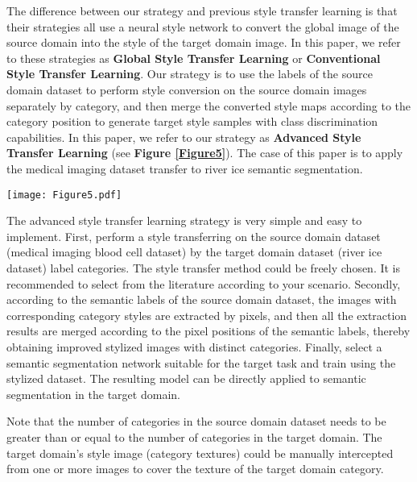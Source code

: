 \documentclass[a4paper,fleqn]{cas-dc}
\begin{document}
The difference between our strategy and previous style transfer learning \cite{Li_Ye_Cao_Hou_Yang_2021, Kline_2021, Zhao_Wei_Lu_Bai_Zhao_Chen_Hu_2023} is that their strategies all use a neural style network to convert the global image of the source domain into the style of the target domain image. In this paper, we refer to these strategies as \textbf{Global Style Transfer Learning} or \textbf{Conventional Style Transfer Learning}. Our strategy is to use the labels of the source domain dataset to perform style conversion on the source domain images separately by category, and then merge the converted style maps according to the category position to generate target style samples with class discrimination capabilities. In this paper, we refer to our strategy as \textbf{Advanced Style Transfer Learning} (see \textbf{Figure \ref{Figure5}}). The case of this paper is to apply the medical imaging dataset transfer to river ice semantic segmentation.

\begin{figure*}[h]
	\centering
	\texttt{[image: Figure5.pdf]}
	\caption{The strategy of Advanced Style Transfer Learning.}\label{Figure5}
\end{figure*}

The advanced style transfer learning strategy is very simple and easy to implement. First, perform a style transferring on the source domain dataset (medical imaging blood cell dataset) by the target domain dataset (river ice dataset) label categories. The style transfer method could be freely chosen. It is recommended to select from the literature \cite{Lin_Ma_Li_He_Li_Ding_Wang_Li_Gao_2021} according to your scenario. Secondly, according to the semantic labels of the source domain dataset, the images with corresponding category styles are extracted by pixels, and then all the extraction results are merged according to the pixel positions of the semantic labels, thereby obtaining improved stylized images with distinct categories. Finally, select a semantic segmentation network suitable for the target task and train using the stylized dataset. The resulting model can be directly applied to semantic segmentation in the target domain.

Note that the number of categories in the source domain dataset needs to be greater than or equal to the number of categories in the target domain. The target domain's style image (category textures) could be manually intercepted from one or more images to cover the texture of the target domain category.
\end{document}

